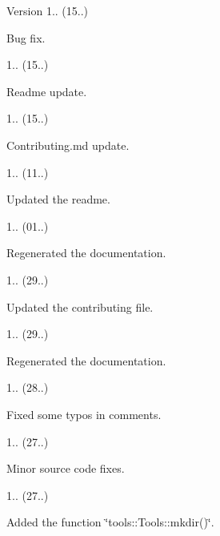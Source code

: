 \begin{DoxyVersion}{Version}
1.. (15..)
\begin{DoxyItemize}
\item Bug fix. 
\end{DoxyItemize}

1.. (15..)
\begin{DoxyItemize}
\item Readme update. 
\end{DoxyItemize}

1.. (15..)
\begin{DoxyItemize}
\item Contributing.\+md update. 
\end{DoxyItemize}

1.. (11..)
\begin{DoxyItemize}
\item Updated the readme. 
\end{DoxyItemize}

1.. (01..)
\begin{DoxyItemize}
\item Regenerated the documentation. 
\end{DoxyItemize}

1.. (29..)
\begin{DoxyItemize}
\item Updated the contributing file. 
\end{DoxyItemize}

1.. (29..)
\begin{DoxyItemize}
\item Regenerated the documentation. 
\end{DoxyItemize}

1.. (28..)
\begin{DoxyItemize}
\item Fixed some typos in comments. 
\end{DoxyItemize}

1.. (27..)
\begin{DoxyItemize}
\item Minor source code fixes. 
\end{DoxyItemize}

1.. (27..)
\begin{DoxyItemize}
\item Added the function \char`\"{}tools\+::\+Tools\+::mkdir()\char`\"{}. 
\end{DoxyItemize}


\end{DoxyVersion}
